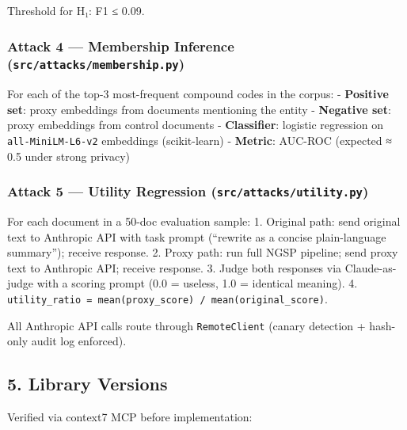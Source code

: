 Threshold for H₁: F1 ≤ 0.09.

\subsubsection{\texorpdfstring{Attack 4 --- Membership Inference
(\texttt{src/attacks/membership.py})}{Attack 4 --- Membership Inference (src/attacks/membership.py)}}\label{attack-4-membership-inference-srcattacksmembership.py}

For each of the top-3 most-frequent compound codes in the corpus: -
\textbf{Positive set}: proxy embeddings from documents mentioning the
entity - \textbf{Negative set}: proxy embeddings from control documents
- \textbf{Classifier}: logistic regression on \texttt{all-MiniLM-L6-v2}
embeddings (scikit-learn) - \textbf{Metric}: AUC-ROC (expected ≈ 0.5
under strong privacy)

\subsubsection{\texorpdfstring{Attack 5 --- Utility Regression
(\texttt{src/attacks/utility.py})}{Attack 5 --- Utility Regression (src/attacks/utility.py)}}\label{attack-5-utility-regression-srcattacksutility.py}

For each document in a 50-doc evaluation sample: 1. Original path: send
original text to Anthropic API with task prompt (``rewrite as a concise
plain-language summary''); receive response. 2. Proxy path: run full
NGSP pipeline; send proxy text to Anthropic API; receive response. 3.
Judge both responses via Claude-as-judge with a scoring prompt (0.0 =
useless, 1.0 = identical meaning). 4.
\texttt{utility\_ratio\ =\ mean(proxy\_score)\ /\ mean(original\_score)}.

All Anthropic API calls route through \texttt{RemoteClient} (canary
detection + hash-only audit log enforced).

\subsection{5. Library Versions}\label{library-versions}

Verified via context7 MCP before implementation:

